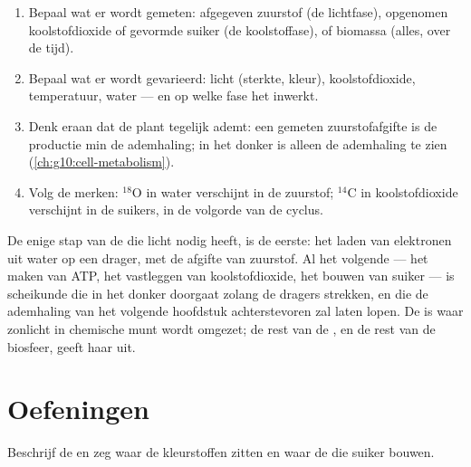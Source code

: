 \begin{method}\label{met:g12:photosynthesis:experiment}
\begin{enumerate}
  \item Bepaal wat er wordt gemeten: afgegeven zuurstof (de lichtfase),
        opgenomen koolstofdioxide of gevormde suiker (de koolstoffase), of
        biomassa (alles, over de tijd).
  \item Bepaal wat er wordt gevarieerd: licht (sterkte, kleur),
        koolstofdioxide, temperatuur, water --- en op welke fase het
        inwerkt.
  \item Denk eraan dat de plant tegelijk ademt: een gemeten
        zuurstofafgifte is de productie min de ademhaling; in het donker
        is alleen de ademhaling te zien (\cref{ch:g10:cell-metabolism}).
  \item Volg de merken: $^{18}$O in water verschijnt in de zuurstof;
        $^{14}$C in koolstofdioxide verschijnt in de suikers, in de
        volgorde van de cyclus.
\end{enumerate}
\end{method}

\begin{remark}\label{rem:g12:photosynthesis:light}
De enige stap van de  die licht nodig heeft, is de eerste: het
laden van elektronen uit water op een drager, met de afgifte van zuurstof.
Al het volgende --- het maken van ATP, het vastleggen van koolstofdioxide,
het bouwen van suiker --- is scheikunde die in het donker doorgaat zolang
de dragers strekken, en die de ademhaling van het volgende hoofdstuk
achterstevoren zal laten lopen. De  is waar zonlicht in
chemische munt wordt omgezet; de rest van de , en de rest van de
biosfeer, geeft haar uit.
\end{remark}

\section{Oefeningen}

\begin{exercise}[$\star$]\label{exo:g12:photosynthesis:1}
Beschrijf de  en zeg waar de kleurstoffen zitten en waar de
 die suiker bouwen.
\end{exercise}

